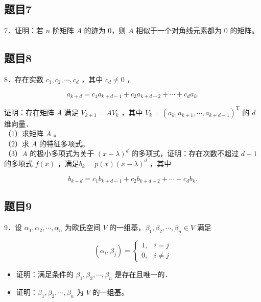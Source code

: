 \documentclass{article}
\begin{document}
\subsection{题目7}
7．证明：若 \(n\) 阶矩阵 \(A\) 的迹为 0，则 \(A\) 相似于一个对角线元素都为 0 的矩阵。

\subsection{题目8}
8．存在实数 \(c_{1}, c_{2}, \cdots, c_{d}\) ，其中 \(c_{d} \neq 0\) ，

\[
a_{k+d}=c_{1} a_{k+d-1}+c_{2} a_{k+d-2}+\cdots+c_{d} a_{k} .
\]

证明：存在矩阵 \(A\) 满足 \(V_{k+1}=A V_{k}\) ，其中 \(V_{k}=\left(a_{k}, a_{k+1}, \cdots, a_{k+d-1}\right)^{\mathrm{T}}\) 的 \(d\) 维向量．\\
（1）求矩阵 \(A\) 。\\
（2）求 \(A\) 的特征多项式。\\
（3）\(A\) 的极小多项式为关于 \((x-\lambda)^{d}\) 的多项式，证明：存在次数不超过 \(d-1\) 的多项式 \(f(x)\) ，满足\(b_{k}=p(x)(x-\lambda)^{d}\) ，其中

\[
b_{k+d}=c_{1} b_{k+d-1}+c_{2} b_{k+d-2}+\cdots+c_{d} b_{k} .
\]

\subsection{题目9}
9．设 \(\alpha_{1}, \alpha_{2}, \cdots, \alpha_{n}\) 为欧氏空间 \(V\) 的一组基，\(\beta_{1}, \beta_{2}, \cdots, \beta_{n} \in V\) 满足

\[
\left(\alpha_{i}, \beta_{j}\right)= \begin{cases}1, & i=j \\ 0, & i \neq j\end{cases}
\]

\begin{itemize}
  \item[（1）] 证明：满足条件的 \(\beta_{1}, \beta_{2}, \cdots, \beta_{n}\) 是存在且唯一的．
  \item[（2）] 证明：\(\beta_{1}, \beta_{2}, \cdots, \beta_{n}\) 为 \(V\) 的一组基。
\end{itemize}
\end{document}
